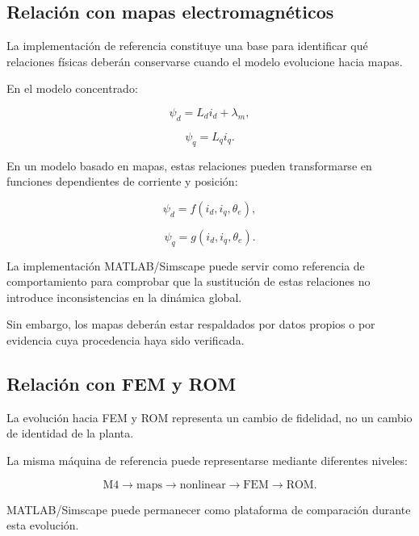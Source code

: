 \subsection{Relación con mapas electromagnéticos}

La implementación de referencia constituye una base para identificar qué relaciones físicas deberán conservarse cuando el modelo evolucione hacia mapas.

En el modelo concentrado:

\begin{equation}
\psi_d=L_di_d+\lambda_m,
\end{equation}

\begin{equation}
\psi_q=L_qi_q.
\end{equation}

En un modelo basado en mapas, estas relaciones pueden transformarse en funciones dependientes de corriente y posición:

\begin{equation}
\psi_d=
f(i_d,i_q,\theta_e),
\end{equation}

\begin{equation}
\psi_q=
g(i_d,i_q,\theta_e).
\end{equation}

La implementación MATLAB/Simscape puede servir como referencia de comportamiento para comprobar que la sustitución de estas relaciones no introduce inconsistencias en la dinámica global.

Sin embargo, los mapas deberán estar respaldados por datos propios o por evidencia cuya procedencia haya sido verificada.

\subsection{Relación con FEM y ROM}

La evolución hacia FEM y ROM representa un cambio de fidelidad, no un cambio de identidad de la planta.

La misma máquina de referencia puede representarse mediante diferentes niveles:

\begin{equation}
\mathrm{M4}
\rightarrow
\mathrm{maps}
\rightarrow
\mathrm{nonlinear}
\rightarrow
\mathrm{FEM}
\rightarrow
\mathrm{ROM}.
\end{equation}

MATLAB/Simscape puede permanecer como plataforma de comparación durante esta evolución.


